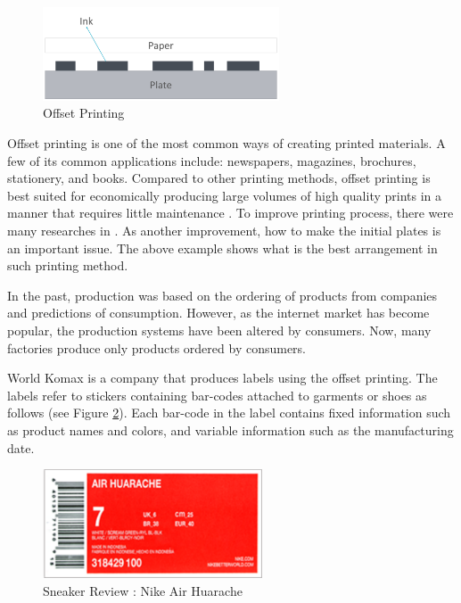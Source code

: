 \documentclass[a4paper]{amsart}
\numberwithin{equation}{section} %
\numberwithin{figure}{section} %
\numberwithin{table}{section}
\theoremstyle{plain}
\theoremstyle{definition}
\theoremstyle{plain}
\theoremstyle{plain}
\theoremstyle{plain}
\theoremstyle{plain}
\theoremstyle{plain}
\begin{document}
\begin{figure}[h!]
	\centering
	\includegraphics[width=7cm]{OffsetPrint.pdf}
	\caption{Offset Printing}
	\label{fig:OffsetPrint}
\end{figure}

Offset printing is one of the most common ways of creating printed materials. A few of its common applications include: newspapers, magazines, brochures, stationery, and books. Compared to other printing methods, offset printing is best suited for economically producing large volumes of high quality prints in a manner that requires little maintenance \cite{Kipphan2001}. 
To improve printing process, there were many researches in \cite{AlChan, Muscle, Carmo}.
As another improvement, how to make the initial plates is an important issue. 
The above example shows what is the best arrangement in such printing method.

In the past, production was based on the ordering of products from companies and predictions of consumption. 
However, as the internet market has become popular, the production systems have been altered by consumers. 
Now, many factories produce only products ordered by consumers.

World Komax is a company that produces labels using the offset printing. The labels refer to stickers containing bar-codes attached to garments or shoes as follows (see Figure \ref{fig:AirHuarache}). Each bar-code in the label contains fixed information such as product names and colors, and variable information such as the manufacturing date.

\begin{figure}[h!]
	\centering
	\includegraphics[width=6.5cm]{AirHuarache.pdf}
	\caption{Sneaker Review : Nike Air Huarache}
	\label{fig:AirHuarache}       %
\end{figure}
\end{document}
